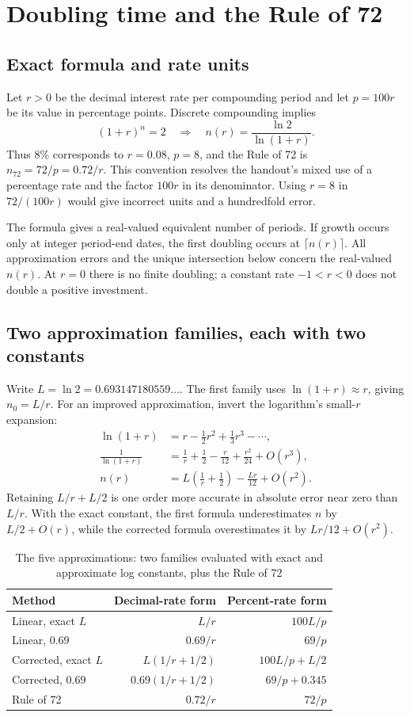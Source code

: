 \documentclass[11pt,letterpaper]{article}
\begin{document}
\section{Doubling time and the Rule of 72}
\subsection{Exact formula and rate units}
Let $r>0$ be the decimal interest rate per compounding period and let $p=100r$
be its value in percentage points. Discrete compounding implies
\begin{equation}
(1+r)^n=2\quad\Longrightarrow\quad
\boxed{n(r)=\frac{\ln2}{\ln(1+r)}}.
\end{equation}
Thus 8\% corresponds to $r=0.08$, $p=8$, and the Rule of 72 is
$n_{72}=72/p=0.72/r$. This convention resolves the handout's mixed use of a
percentage rate and the factor $100r$ in its denominator. Using $r=8$ in
$72/(100r)$ would give incorrect units and a hundredfold error.

The formula gives a real-valued equivalent number of periods. If growth occurs
only at integer period-end dates, the first doubling occurs at $\lceil n(r)\rceil$.
All approximation errors and the unique intersection below concern the real-valued
$n(r)$. At $r=0$ there is no finite doubling; a constant rate $-1<r<0$ does not double a positive investment.

\subsection{Two approximation families, each with two constants}
Write $L=\ln2=0.693147180559\ldots$. The first family uses
$\ln(1+r)\approx r$, giving $n_0=L/r$. For an improved approximation, invert
the logarithm's small-$r$ expansion:
\begin{align}
\ln(1+r)&=r-\tfrac12r^2+\tfrac13r^3-\cdots,\\
\frac{1}{\ln(1+r)}&=\frac1r+\frac12-\frac{r}{12}+\frac{r^2}{24}+O(r^3),\\
n(r)&=L\left(\frac1r+\frac12\right)-\frac{Lr}{12}+O(r^2).
\end{align}
Retaining $L/r+L/2$ is one order more accurate in absolute error near zero than
$L/r$. With the exact constant, the first formula underestimates $n$ by
$L/2+O(r)$, while the corrected formula overestimates it by $Lr/12+O(r^2)$.
\begin{table}[H]\centering\small\setlength{\tabcolsep}{5pt}\caption{The five approximations: two families evaluated with exact and approximate log constants, plus the Rule of 72}
\begin{tabular}{lrr}\toprule
Method & Decimal-rate form & Percent-rate form\\\midrule
Linear, exact $L$ & $L/r$ & $100L/p$\\
Linear, $0.69$ & $0.69/r$ & $69/p$\\
Corrected, exact $L$ & $L(1/r+1/2)$ & $100L/p+L/2$\\
Corrected, $0.69$ & $0.69(1/r+1/2)$ & $69/p+0.345$\\
Rule of 72 & $0.72/r$ & $72/p$\\
\bottomrule\end{tabular}\end{table}
\end{document}
